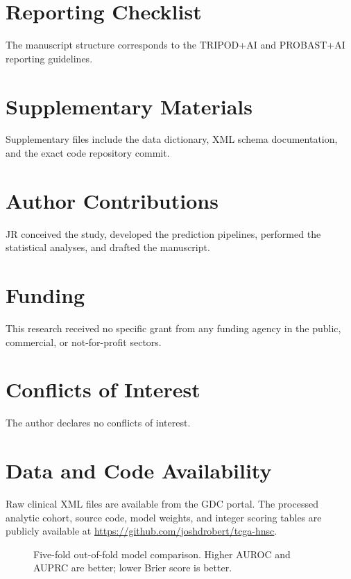 \documentclass[11pt]{article}
\begin{document}
\section*{Reporting Checklist}
The manuscript structure corresponds to the TRIPOD+AI and PROBAST+AI reporting guidelines.

\section*{Supplementary Materials}
Supplementary files include the data dictionary, XML schema documentation, and the exact code repository commit.

\section*{Author Contributions}
JR conceived the study, developed the prediction pipelines, performed the statistical analyses, and drafted the manuscript.

\section*{Funding}
This research received no specific grant from any funding agency in the public, commercial, or not-for-profit sectors.

\section*{Conflicts of Interest}
The author declares no conflicts of interest.

\section*{Data and Code Availability}
Raw clinical XML files are available from the GDC portal. The processed analytic cohort, source code, model weights, and integer scoring tables are publicly available at \url{https://github.com/joshdrobert/tcga-hnsc}.

\begin{figure}[H]
\centering
{}
\caption{Five-fold out-of-fold model comparison. Higher AUROC and AUPRC are better; lower Brier score is better.}
\end{figure}
\end{document}
